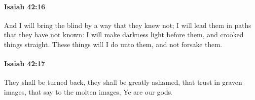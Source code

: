 		\paragraph{Isaiah 42:16} %
			\label{ISAIAH-42-16}

			And I will bring the blind by a way that they knew not; I will lead them in paths that they have not known: I will make darkness light before them, and crooked things straight. These things will I do unto them, and not forsake them.


		\paragraph{Isaiah 42:17} %
			\label{ISAIAH-42-17}

			They shall be turned back, they shall be greatly ashamed, that trust in graven images, that say to the molten images, Ye are our gods.


